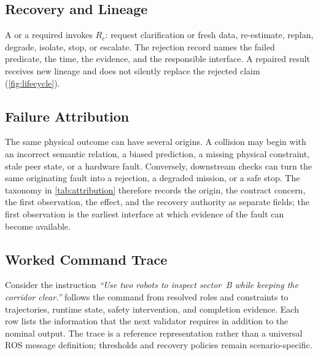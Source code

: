 

\subsection{Recovery and Lineage}

A \false{} or a required \unknown{} invokes $R_e$: request clarification or
fresh data, re-estimate, replan, degrade, isolate, stop, or escalate.  The
rejection record names the failed predicate, the time, the evidence, and the
responsible interface.  A repaired result receives new lineage and does not
silently replace the rejected claim (\cref{fig:lifecycle}).



\subsection{Failure Attribution}
\label{sec:attribution}

The same physical outcome can have several origins.  A collision may begin with
an incorrect semantic relation, a biased prediction, a missing physical
constraint, stale peer state, or a hardware fault.  Conversely, downstream
checks can turn the same originating fault into a rejection, a degraded mission,
or a safe stop.  The taxonomy in \cref{tab:attribution} therefore records the
origin, the contract concern, the first observation, the effect, and the
recovery authority as separate fields; the first observation is the earliest
interface at which evidence of the fault can become available.

\subsection{Worked Command Trace}
\label{sec:trace}

Consider the instruction \emph{``Use two robots to inspect sector~B while
keeping the corridor clear.''}   follows the command
from resolved roles and constraints to trajectories, runtime state, safety
intervention, and completion evidence.  Each row lists the information that the
next validator requires in addition to the nominal output.  The trace is a
reference representation rather than a universal ROS message definition;
thresholds and recovery policies remain scenario-specific.
